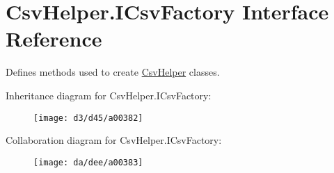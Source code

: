 \hypertarget{a00088}{\section{Csv\-Helper.\-I\-Csv\-Factory Interface Reference}
\label{a00088}
}


Defines methods used to create \hyperlink{a00284}{Csv\-Helper} classes.  




Inheritance diagram for Csv\-Helper.\-I\-Csv\-Factory\-:
\nopagebreak
\begin{figure}[H]
\begin{center}
\leavevmode
\texttt{[image: d3/d45/a00382]}
\end{center}
\end{figure}


Collaboration diagram for Csv\-Helper.\-I\-Csv\-Factory\-:
\nopagebreak
\begin{figure}[H]
\begin{center}
\leavevmode
\texttt{[image: da/dee/a00383]}
\end{center}
\end{figure}
